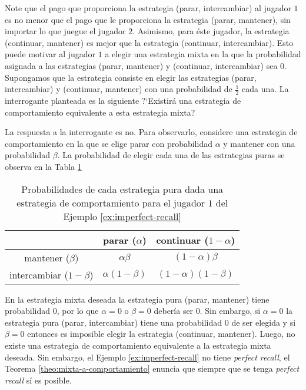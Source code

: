 Note que el pago que proporciona la estrategia (parar, intercambiar) al jugador $1$ es no menor que el pago que le proporciona la estrategia (parar, mantener), sin importar lo que juegue el jugador $2$. Asimismo, para éste jugador, la estrategia (continuar, mantener) es mejor que la estrategia (continuar, intercambiar). Esto puede motivar al jugador $1$ a elegir una estrategia mixta en la que la probabilidad asignada a las estrategias (parar, mantener) y (continuar, intercambiar) sea $0$. Supongamos que la estrategia consiste en elegir las estrategias (parar, intercambiar) y (continuar, mantener) con una probabilidad de $\frac{1}{2}$ cada una. La interrogante planteada es la siguiente ?`Existirá una estrategia de comportamiento equivalente a esta estrategia mixta?

La respuesta a la interrogante es no. Para observarlo, considere una estrategia de comportamiento en la que se elige parar con probabilidad $\alpha$ y mantener con una probabilidad $\beta$. La probabilidad de elegir cada una de las estrategias puras se observa en la Tabla \ref{table:proba-ep}

\begin{table}[ht]
\begin{center}
\caption[Probabilidades de las Estrategias Puras]{Probabilidades de cada estrategia pura dada una estrategia de comportamiento para el jugador $1$ del Ejemplo \ref{ex:imperfect-recall}}
\label{table:proba-ep}
\begin{tabular}{c c c}
\hline
& parar ($\alpha$) & continuar ($1 - \alpha$) \\ \hline
mantener ($\beta$)       & $\alpha\beta$     & $(1-\alpha)\beta$    \\
intercambiar ($1-\beta$) & $\alpha(1-\beta)$ & $(1-\alpha)(1-\beta)$\\ \hline
\end{tabular}
\end{center}
\end{table}

En la estrategia mixta deseada la estrategia pura (parar, mantener) tiene probabilidad $0$, por lo que $\alpha = 0$ o $\beta = 0$ debería ser $0$. Sin embargo, si $\alpha = 0$ la estrategia pura (parar, intercambiar) tiene una probabilidad $0$ de ser elegida y si $\beta = 0$ entonces es imposible elegir la estrategia (continuar, mantener). Luego, no existe una estrategia de comportamiento equivalente a la estrategia mixta deseada. Sin embargo, el Ejemplo \ref{ex:imperfect-recall} no tiene \textit{perfect recall}, el Teorema \ref{theo:mixta-a-comportamiento} enuncia que siempre que se tenga \textit{perfect recall} sí es posible.

